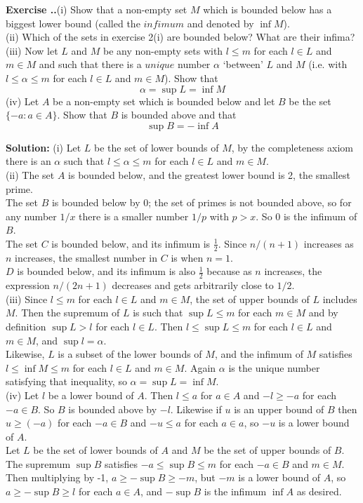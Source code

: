 \documentclass{article}
\newcounter{chapter}[section] %
\newcounter{example}[chapter]
\newcommand{\solution}[1]{\setlength{\hangindent}{\parindent} \indent\indent \textbf{Solution: }#1\hfill\break}
\newcommand{\exercise}[1]{
	
	\refstepcounter{example}
    \hangafter=1
    \setlength{\hangindent}{ 
    	\widthof{
			\large\textbf{Exercise \thesection.\thechapter.\theexample\enspace}
    	}-.5\parindent
    }
    {\setlength{\parindent}{0in}\large\textbf{Exercise \thesection.\thechapter.\theexample\enspace}#1}\hfill\break\par
}
\begin{document}
\exercise{(i) Show that a non-empty set $M$ which is bounded below has a biggest lower bound (called the $\textit{infimum}$ and denoted by $\inf M$). \\
\indent (ii) Which of the sets in exercise 2(i) are bounded below? What are their infima? \\ 
\indent (iii) Now let $L$ and $M$ be any non-empty sets with $l \leq m$ for each $l\in L$ and $m\in M$ and such that there is a $\textit{unique}$ number $\alpha$ `between' $L$ and $M$ (i.e. with $l\leq \alpha \leq m$ for each $l\in L$ and $m\in M$). Show that $$\alpha = \sup L = \inf M$$ 
\indent (iv) Let $A$ be a non-empty set which is bounded below and let $B$ be the set $\{-a: a\in A\}$. Show that $B$ is bounded above and that $$\sup B = -\inf A$$} %
\solution{(i) Let $L$ be the set of lower bounds of $M$, by the completeness axiom there is an $\alpha$ such that $l\leq \alpha \leq m$ for each $l\in L$ and $m\in M$.\\
\indent (ii) The set $A$ is bounded below, and the greatest lower bound is 2, the smallest prime. \\ \indent The set $B$ is bounded below by 0; the set of primes is not bounded above, so for any number $1/x$ there is a smaller number $1/p$ with $p>x$. So 0 is the infimum of $B$. \\ \indent The set $C$ is bounded below, and its infimum is $\frac{1}{2}$. Since $n/(n+1)$ increases as $n$ increases, the smallest number in $C$ is when $n = 1$. \\ \indent $D$ is bounded below, and its infimum is also $\frac{1}{2}$ because as $n$ increases, the expression $n/(2n+1)$ decreases and gets arbitrarily close to $1/2$. \\ 
\indent (iii) Since $l\leq m$ for each $l \in L$ and $m\in M$, the set of upper bounds of $L$ includes $M$. Then the supremum of $L$ is such that $\sup L \leq m$ for each $m \in M$ and by definition $\sup L > l$ for each $l\in L$. Then $l \leq \sup L \leq m$ for each $l\in L$ and $m \in M$, and $\sup l=\alpha$. \\
\indent Likewise, $L$ is a subset of the lower bounds of $M$, and the infimum of $M$ satisfies $l \leq \inf M \leq m$ for each $l \in L$ and $m \in M$. Again $\alpha$ is the unique number satisfying that inequality, so $\alpha = \sup L = \inf M$. \\ 
\indent (iv) Let $l$ be a lower bound of $A$. Then $l\leq a$ for $a \in A$ and $-l \geq -a$ for each $-a \in B$. So $B$ is bounded above by $-l$. Likewise if $u$ is an upper bound of $B$ then $u\geq (-a)$ for each $-a\in B$ and $-u \leq a$ for each $a\in a$, so $-u$ is a lower bound of $A$. \\ 
\indent Let $L$ be the set of lower bounds of $A$ and $M$ be the set of upper bounds of $B$. The supremum $\sup B$ satisfies $-a \leq \sup B \leq m$ for each $-a\in B$ and $m\in M$. Then multiplying by -1, $a \geq -\sup B \geq -m$, but $-m$ is a lower bound of $A$, so $a\geq -\sup B \geq l$ for each $a \in A$, and $-\sup B$ is the infimum $\inf A$ as desired.} %
\end{document}

